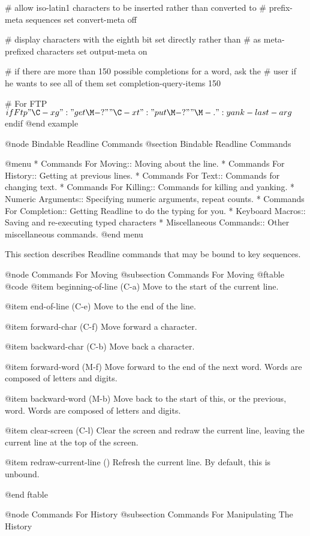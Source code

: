 {{# allow iso-latin1 characters to be inserted rather than converted to
# prefix-meta sequences
set convert-meta off

# display characters with the eighth bit set directly rather than
# as meta-prefixed characters
set output-meta on

# if there are more than 150 possible completions for a word, ask the
# user if he wants to see all of them
set completion-query-items 150

# For FTP
$if Ftp
"\C-xg": "get \M-?"
"\C-xt": "put \M-?"
"\M-.": yank-last-arg
$endif
@end example

@node Bindable Readline Commands
@section Bindable Readline Commands

@menu
* Commands For Moving::         Moving about the line.
* Commands For History::        Getting at previous lines.
* Commands For Text::           Commands for changing text.
* Commands For Killing::        Commands for killing and yanking.
* Numeric Arguments::           Specifying numeric arguments, repeat counts.
* Commands For Completion::     Getting Readline to do the typing for you.
* Keyboard Macros::             Saving and re-executing typed characters
* Miscellaneous Commands::      Other miscellaneous commands.
@end menu

This section describes Readline commands that may be bound to key
sequences.

@node Commands For Moving
@subsection Commands For Moving
@ftable @code
@item beginning-of-line (C-a)
Move to the start of the current line.

@item end-of-line (C-e)
Move to the end of the line.

@item forward-char (C-f)
Move forward a character.

@item backward-char (C-b)
Move back a character.

@item forward-word (M-f)
Move forward to the end of the next word.  Words are composed of
letters and digits.

@item backward-word (M-b)
Move back to the start of this, or the previous, word.  Words are
composed of letters and digits.

@item clear-screen (C-l)
Clear the screen and redraw the current line,
leaving the current line at the top of the screen.

@item redraw-current-line ()
Refresh the current line.  By default, this is unbound.

@end ftable

@node Commands For History
@subsection Commands For Manipulating The History

}}
